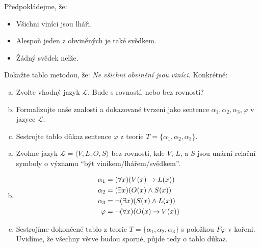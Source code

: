       
\begin{problem}

    Předpokládejme, že:
    \begin{itemize}\it
        \item Všichni viníci jsou lháři.
        \item Alespoň jeden z obviněných je také svědkem.
        \item Žádný svědek nelže.
    \end{itemize}

    Dokažte tablo metodou, že: {\it Ne všichni obvinění jsou viníci.} Konkrétně:
    \begin{enumerate}[(a)]
        \item Zvolte vhodný jazyk $\mathcal L$. Bude s rovností, nebo bez rovnosti?        
        \item Formalizujte naše znalosti a dokazované tvrzení jako sentence $\alpha_1,\alpha_2,\alpha_3,\varphi$ v jazyce $\mathcal L$.
        \item Sestrojte tablo důkaz sentence $\varphi$ z teorie $T=\{\alpha_1,\alpha_2,\alpha_3\}$.
    \end{enumerate}

    \begin{solution}

        \begin{enumerate}[(a)]
            \item Zvolme jazyk $\mathcal L=\langle V,L,O,S\rangle$ bez rovnosti, kde $V$, $L$, a $S$ jsou unární relační symboly o významu ``být viníkem/lhářem/svědkem''.
            \item 
            \begin{align*}
                \alpha_1 & = (\forall x)(V(x)\to L(x)) \\
                \alpha_2 & = (\exists x)(O(x)\land S(x)) \\
                \alpha_3 & = \neg(\exists x)(S(x)\land L(x)) \\
                \varphi & = \neg (\forall x)(O(x)\mathbin{\rightarrow} V(x))
            \end{align*}
            \item Sestrojíme dokončené tablo z teorie $T=\{\alpha_1,\alpha_2,\alpha_3\}$ s položkou $F\varphi$ v kořeni. Uvidíme, že všechny větve budou sporné, půjde tedy o tablo důkaz.
            

\end{enumerate}
\end{solution}
\end{problem}

